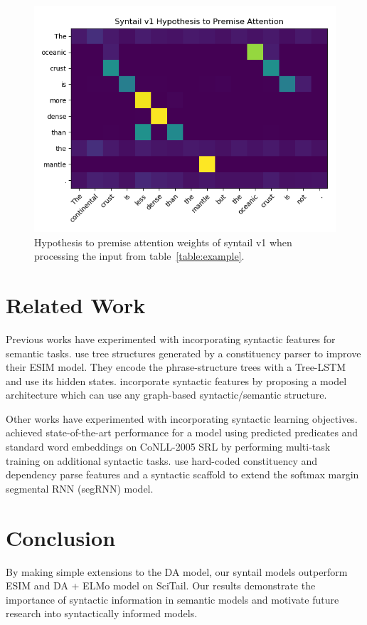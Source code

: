 \documentclass[11pt,a4paper]{article}
\begin{document}
\begin{figure}[htb]
  \centering
  \includegraphics[width=\linewidth]{figures/syntail-h2p-attention.png}
  \caption{Hypothesis to premise attention weights of syntail v1 when
      processing the input from table~\ref{table:example}.}
\label{fig:sytail-attention-weights}
\end{figure}

\section{Related Work}

Previous works have experimented with incorporating syntactic features for
semantic tasks.  \citet{chen2016enhanced} use tree structures generated by a
constituency parser to improve their ESIM model. They encode the
phrase-structure trees with a Tree-LSTM and use its hidden states.
\citet{Khot2018-th} incorporate syntactic features by proposing a model
architecture which can use any graph-based syntactic/semantic structure.

Other works have experimented with incorporating syntactic learning objectives.
\citet{strubell2018linguistically} achieved state-of-the-art performance for a
model using predicted predicates and standard word embeddings on CoNLL-2005 SRL
by performing multi-task training on additional syntactic tasks.
\citet{swayamdipta2017frame} use hard-coded constituency and dependency parse
features and a syntactic scaffold to extend the softmax margin segmental RNN
(segRNN) model.

\section{Conclusion}

By making simple extensions to the DA model, our syntail models outperform ESIM
and DA + ELMo model on SciTail.  Our results demonstrate the importance of
syntactic information in semantic models and motivate future research into
syntactically informed models.



\end{document}
